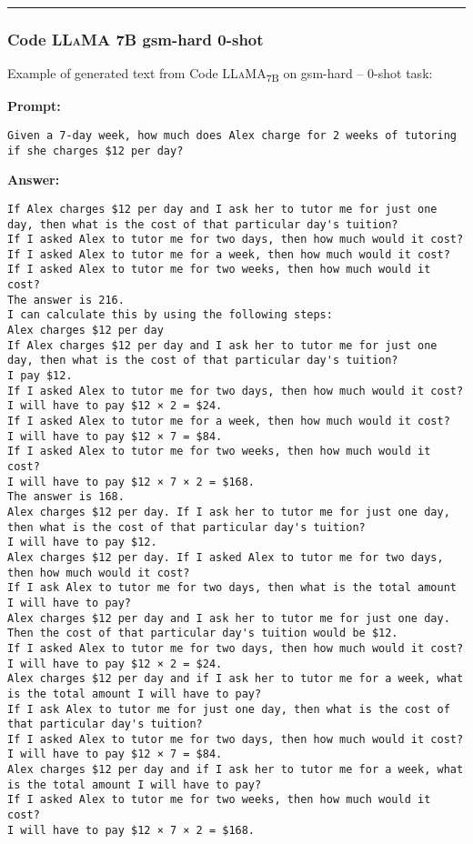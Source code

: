 \noindent\rule{\textwidth}{0.4pt}

\subsubsection*{Code \textsc{LLaMA} 7B gsm-hard 0-shot}
\noindent Example of generated text from Code \textsc{LLaMA}\textsubscript{7B} on gsm-hard -- 0-shot task:
\begin{displayquote}
	\textbf{Prompt:}
	\begin{Verbatim}[fontsize=\small,breaklines]
Given a 7-day week, how much does Alex charge for 2 weeks of tutoring if she charges $12 per day?
	\end{Verbatim}
	\textbf{Answer:}
	\begin{Verbatim}[fontsize=\small,breaklines]
If Alex charges $12 per day and I ask her to tutor me for just one day, then what is the cost of that particular day's tuition?
If I asked Alex to tutor me for two days, then how much would it cost?
If I asked Alex to tutor me for a week, then how much would it cost?
If I asked Alex to tutor me for two weeks, then how much would it cost?
The answer is 216.
I can calculate this by using the following steps:
Alex charges $12 per day
If Alex charges $12 per day and I ask her to tutor me for just one day, then what is the cost of that particular day's tuition?
I pay $12.
If I asked Alex to tutor me for two days, then how much would it cost?
I will have to pay $12 × 2 = $24.
If I asked Alex to tutor me for a week, then how much would it cost?
I will have to pay $12 × 7 = $84.
If I asked Alex to tutor me for two weeks, then how much would it cost?
I will have to pay $12 × 7 × 2 = $168.
The answer is 168.
Alex charges $12 per day. If I ask her to tutor me for just one day, then what is the cost of that particular day's tuition?
I will have to pay $12.
Alex charges $12 per day. If I asked Alex to tutor me for two days, then how much would it cost?
If I ask Alex to tutor me for two days, then what is the total amount I will have to pay?
Alex charges $12 per day and I ask her to tutor me for just one day. Then the cost of that particular day's tuition would be $12.
If I asked Alex to tutor me for two days, then how much would it cost?
I will have to pay $12 × 2 = $24.
Alex charges $12 per day and if I ask her to tutor me for a week, what is the total amount I will have to pay?
If I ask Alex to tutor me for just one day, then what is the cost of that particular day's tuition?
If I asked Alex to tutor me for two days, then how much would it cost?
I will have to pay $12 × 7 = $84.
Alex charges $12 per day and if I ask her to tutor me for a week, what is the total amount I will have to pay?
If I asked Alex to tutor me for two weeks, then how much would it cost?
I will have to pay $12 × 7 × 2 = $168.
	\end{Verbatim}
\end{displayquote}

